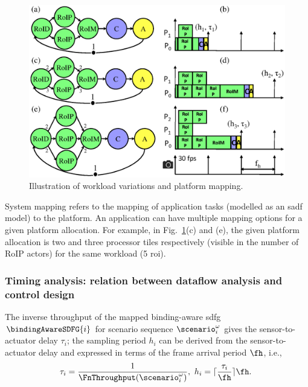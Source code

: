 \begin{figure}
    \centering
    \includegraphics[scale=0.5]{images/SADFeg.eps}
    \caption{Illustration of workload variations and platform mapping.}
    \label{fig:ch5_SADFeg}
\end{figure}

System mapping refers to the mapping of application tasks (modelled as an \gls{sadf} model) to the platform. An application can have multiple mapping options for a given platform allocation. For example, in Fig.~\ref{fig:ch5_SADFeg}(c) and (e), the given platform allocation is two and three processor tiles respectively (visible in the number of RoIP actors) for the same workload (5 \gls{roi}).

\subsubsection{Timing analysis: relation between dataflow analysis and control design}
\label{sec:ch5_relation}
The inverse throughput of the mapped binding-aware \gls{sdfg}  $\bindingAwareSDFG{i}$ for scenario sequence $\scenario_i^\omega$ gives the sensor-to-actuator delay $\tau_{i}$; the sampling period $h_i$ can be derived from the sensor-to-actuator delay and expressed in terms of the frame arrival period $\fh$, i.e.,
\begin{eqnarray}
\tau_{i}= \frac{1}{\FnThroughput(\scenario_i^\omega)},\ h_{i}=\lceil \frac{\tau_{i}}{\fh}\rceil \fh.\
\nonumber
\end{eqnarray}

